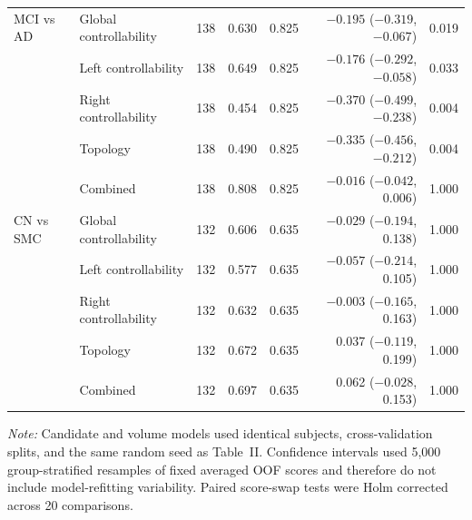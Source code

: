 \documentclass{article}
\providecommand{\DIFaddtex}[1]{{\protect\color{blue}#1}} %
\providecommand{\DIFadd}[1]{\texorpdfstring{\DIFaddtex{#1}}{#1}} %
\begin{document}
\begin{landscape}
\begin{longtable}{llrrrrr}
\addlinespace
\DIFadd{MCI vs AD }& \DIFadd{Global controllability }& \DIFadd{138 }& \DIFadd{0.630 }& \DIFadd{0.825 }& \DIFadd{$-0.195$ ($-0.319$, $-0.067$) }& \DIFadd{0.019}\\
& \DIFadd{Left controllability }& \DIFadd{138 }& \DIFadd{0.649 }& \DIFadd{0.825 }& \DIFadd{$-0.176$ ($-0.292$, $-0.058$) }& \DIFadd{0.033}\\
& \DIFadd{Right controllability }& \DIFadd{138 }& \DIFadd{0.454 }& \DIFadd{0.825 }& \DIFadd{$-0.370$ ($-0.499$, $-0.238$) }& \DIFadd{0.004}\\
& \DIFadd{Topology }& \DIFadd{138 }& \DIFadd{0.490 }& \DIFadd{0.825 }& \DIFadd{$-0.335$ ($-0.456$, $-0.212$) }& \DIFadd{0.004}\\
& \DIFadd{Combined }& \DIFadd{138 }& \DIFadd{0.808 }& \DIFadd{0.825 }& \DIFadd{$-0.016$ ($-0.042$, 0.006) }& \DIFadd{1.000}\\
\addlinespace
\DIFadd{CN vs SMC }& \DIFadd{Global controllability }& \DIFadd{132 }& \DIFadd{0.606 }& \DIFadd{0.635 }& \DIFadd{$-0.029$ ($-0.194$, 0.138) }& \DIFadd{1.000}\\
& \DIFadd{Left controllability }& \DIFadd{132 }& \DIFadd{0.577 }& \DIFadd{0.635 }& \DIFadd{$-0.057$ ($-0.214$, 0.105) }& \DIFadd{1.000}\\
& \DIFadd{Right controllability }& \DIFadd{132 }& \DIFadd{0.632 }& \DIFadd{0.635 }& \DIFadd{$-0.003$ ($-0.165$, 0.163) }& \DIFadd{1.000}\\
& \DIFadd{Topology }& \DIFadd{132 }& \DIFadd{0.672 }& \DIFadd{0.635 }& \DIFadd{0.037 ($-0.119$, 0.199) }& \DIFadd{1.000}\\
& \DIFadd{Combined }& \DIFadd{132 }& \DIFadd{0.697 }& \DIFadd{0.635 }& \DIFadd{0.062 ($-0.028$, 0.153) }& \DIFadd{1.000}\\
\bottomrule
\end{longtable}
\footnotesize\DIFadd{\textit{Note:} Candidate and volume models used identical subjects, cross-validation splits, and the same random seed as Table~II. Confidence intervals used 5,000 group-stratified resamples of fixed averaged OOF scores and therefore do not include model-refitting variability. Paired score-swap tests were Holm corrected across 20 comparisons.
}\end{landscape}
\end{document}
